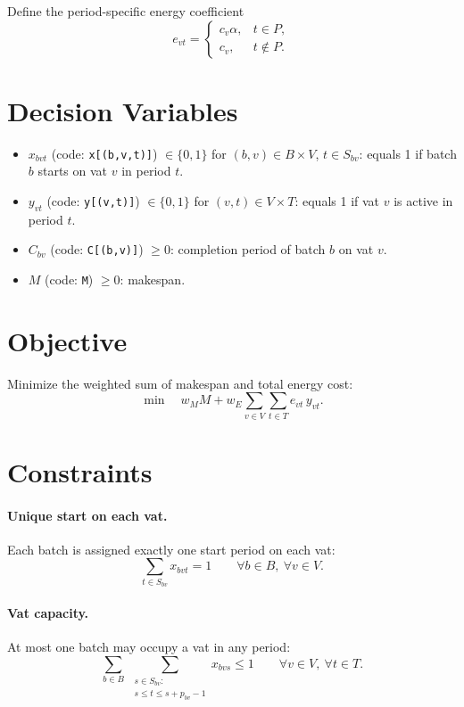Define the period-specific energy coefficient
\[
e_{vt}=
\begin{cases}
c_v\alpha, & t\in P,\\
c_v, & t\notin P.
\end{cases}
\]

\section*{Decision Variables}

\begin{itemize}
    \item $x_{bvt}$ (code: \texttt{x[(b,v,t)]}) $\in \{0,1\}$ for $(b,v)\in B\times V$, $t\in S_{bv}$: equals 1 if batch $b$ starts on vat $v$ in period $t$.
    \item $y_{vt}$ (code: \texttt{y[(v,t)]}) $\in \{0,1\}$ for $(v,t)\in V\times T$: equals 1 if vat $v$ is active in period $t$.
    \item $C_{bv}$ (code: \texttt{C[(b,v)]}) $\ge 0$: completion period of batch $b$ on vat $v$.
    \item $M$ (code: \texttt{M}) $\ge 0$: makespan.
\end{itemize}

\section*{Objective}

Minimize the weighted sum of makespan and total energy cost:
\[
\min \quad w_M M + w_E \sum_{v\in V}\sum_{t\in T} e_{vt}\, y_{vt}.
\]

\section*{Constraints}

\paragraph{Unique start on each vat.}
Each batch is assigned exactly one start period on each vat:
\[
\sum_{t\in S_{bv}} x_{bvt} = 1
\qquad \forall b\in B,\ \forall v\in V.
\]

\paragraph{Vat capacity.}
At most one batch may occupy a vat in any period:
\[
\sum_{b\in B}\ \sum_{\substack{s\in S_{bv}:\\ s \le t \le s+p_{bv}-1}} x_{bvs} \le 1
\qquad \forall v\in V,\ \forall t\in T.
\]

